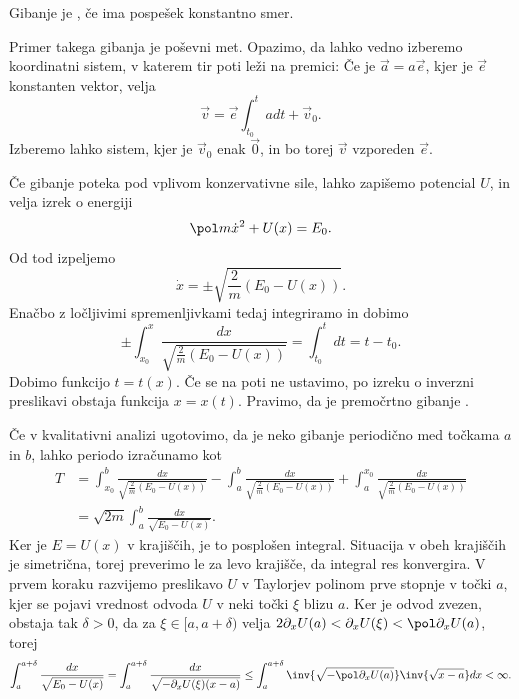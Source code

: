 
\begin{definicija}
  Gibanje je , če ima pospešek konstantno smer.
\end{definicija}

Primer takega gibanja je poševni met.
Opazimo, da lahko vedno izberemo koordinatni sistem, v katerem tir poti leži na
premici:
Če je $\vec{a} = a \vec{e}$, kjer je $\vec{e}$ konstanten vektor, velja
\[
  \vec{v} = \vec{e} \int_{t_0}^t a dt + \vec{v}_0.
\]
Izberemo lahko sistem, kjer je $\vec{v}_0$ enak $\vec{0}$, in bo torej $\vec{v}$
vzporeden $\vec{e}$.

Če gibanje poteka pod vplivom konzervativne sile, lahko zapišemo potencial $U$,
in velja izrek o energiji
\[
  \pol m \dot{x}^2 + U(x) = E_0.
\]
Od tod izpeljemo
\[
  \dot{x} = \pm \sqrt{\frac{2}{m} \left( E_0 - U(x) \right) }.
\]
Enačbo z ločljivimi spremenljivkami tedaj integriramo in dobimo
\[
  \pm \int_{x_0}^{x} \frac{dx}{\sqrt{ \frac{2}{m} \left( E_0 - U(x) \right) } }
  = \int_{t_0}^t dt = t - t_0.
\]
Dobimo funkcijo $t = t(x)$.
Če se na poti ne ustavimo, po izreku o inverzni preslikavi obstaja funkcija $x
= x(t)$.
Pravimo, da je premočrtno gibanje .

Če v kvalitativni analizi ugotovimo, da je neko gibanje periodično med točkama
$a$ in $b$, lahko periodo izračunamo kot
\begin{align*}
  T &= \int_{x_0}^b \frac{dx}{\sqrt{ \frac{2}{m} \left( E_0 - U(x) \right) }}
  - \int_a^b \frac{dx}{\sqrt{ \frac{2}{m} \left( E_0 - U(x) \right) }}
  + \int_a^{x_0} \frac{dx}{\sqrt{ \frac{2}{m} \left( E_0 - U(x) \right) }} \\
  &= \sqrt{2 m} \int_a^b \frac{dx}{ \sqrt{ E_0 - U(x) } }.
\end{align*}
Ker je $E = U(x)$ v krajiščih, je to posplošen integral.
Situacija v obeh krajiščih je simetrična, torej preverimo le za levo krajišče,
da integral res konvergira.
V prvem koraku razvijemo preslikavo $U$ v Taylorjev polinom prve stopnje v točki
$a$, kjer se pojavi vrednost odvoda $U$ v neki točki $\xi$ blizu $a$.
Ker je odvod zvezen, obstaja tak $\delta > 0$, da za $\xi \in [a, a + \delta)$
velja $2 \partial_x U(a) < \partial_x U(\xi) < \pol \partial_x U(a)$, torej
\[
  \int_a^{a + \delta} \frac{dx}{\sqrt{E_0 - U(x)}}
  = \int_a^{a + \delta} \frac{dx}{\sqrt{ - \partial_x U(\xi) (x-a) }}
  \le \int_a^{a + \delta} \inv{\sqrt{ -\pol \partial_x U(a) }} \inv{\sqrt{x -
	  a}} dx
  < \infty.
\]

